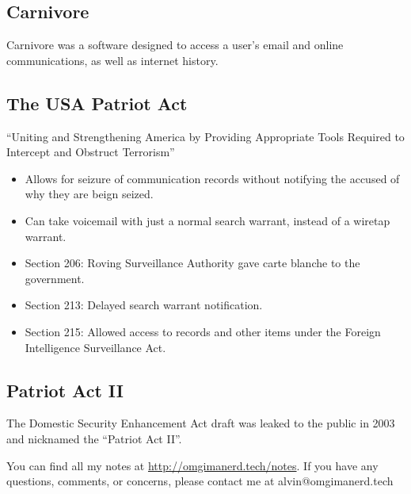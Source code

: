 \documentclass{article}
\begin{document}
\subsection*{Carnivore}
Carnivore was a software designed to access a user's email and online
communications, as well as internet history.

\subsection*{The USA Patriot Act}
``Uniting and Strengthening America by Providing Appropriate Tools Required to
Intercept and Obstruct Terrorism''
\begin{itemize}
  \item Allows for seizure of communication records without notifying the
    accused of why they are beign seized.
  \item Can take voicemail with just a normal search warrant, instead of a
    wiretap warrant.
  \item Section 206: Roving Surveillance Authority gave carte blanche to the
    government.
  \item Section 213: Delayed search warrant notification.
  \item Section 215: Allowed access to records and other items under the
    Foreign Intelligence Surveillance Act.
\end{itemize}

\subsection*{Patriot Act II}
The Domestic Security Enhancement Act draft was leaked to the public in 2003
and nicknamed the ``Patriot Act II''.

\begin{center}
  You can find all my notes at \url{http://omgimanerd.tech/notes}. If you have
  any questions, comments, or concerns, please contact me at
  alvin@omgimanerd.tech
\end{center}
\end{document}
